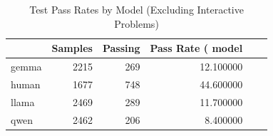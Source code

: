 \begin{table}[htbp]
\caption{Test Pass Rates by Model (Excluding Interactive Problems)}
\label{tab:pass_rate_filtered}
\begin{tabular}{lrrr}
\toprule
 & Samples & Passing & Pass Rate (%
model &  &  &  \\
\midrule
gemma & 2215 & 269 & 12.100000 \\
human & 1677 & 748 & 44.600000 \\
llama & 2469 & 289 & 11.700000 \\
qwen & 2462 & 206 & 8.400000 \\
\bottomrule
\end{tabular}
\end{table}
